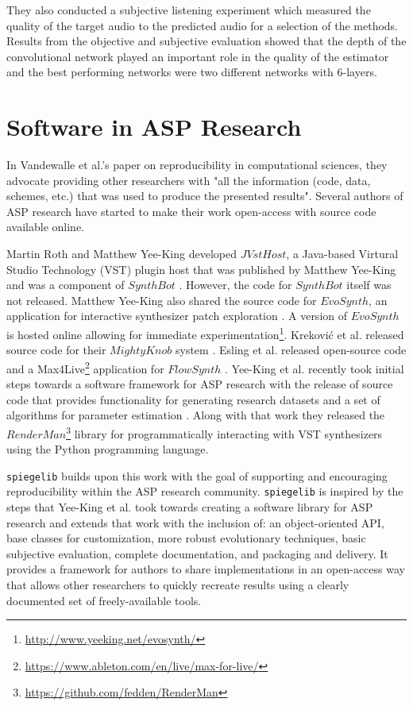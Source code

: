 They also conducted a subjective listening experiment which measured the quality of the target audio to the predicted audio for a selection of the methods. Results from the objective and subjective evaluation showed that the depth of the convolutional network played an important role in the quality of the estimator and the best performing networks were two different networks with 6-layers.

\section{Software in ASP Research}
 In Vandewalle et al.'s paper on reproducibility in computational sciences, they advocate providing other researchers with "all the information (code, data, schemes, etc.) that was used to produce the presented results"\cite{vandewalle2009reproducible}. Several authors of ASP research have started to make their work open-access with source code available online. 
 
 Martin Roth and Matthew Yee-King developed $JVstHost$, a Java-based Virtural Studio Technology (VST) plugin host that was published by Matthew Yee-King \cite{yee2011automatic} and was a component of $SynthBot$ \cite{yee2008synthbot}. However, the code for $SynthBot$ itself was not released. Matthew Yee-King also shared the source code for $EvoSynth$, an application for interactive synthesizer patch exploration \cite{yee2016use}. A version of $EvoSynth$ is hosted online allowing for immediate experimentation\footnote{\url{http://www.yeeking.net/evosynth/}}. Krekovi{\'c} et al. released source code for their $MightyKnob$ system \cite{krekovic2016algorithm}. Esling et al. released open-source code and a Max4Live\footnote{\url{https://www.ableton.com/en/live/max-for-live/}} application for $FlowSynth$ \cite{esling2020flow}. Yee-King et al. recently took initial steps towards a software framework for ASP research with the release of source code that provides functionality for generating research datasets and a set of algorithms for parameter estimation \cite{yee2018automatic}. Along with that work they released the $RenderMan$\footnote{\url{https://github.com/fedden/RenderMan}} library for programmatically interacting with VST synthesizers using the Python programming language.
 
 \texttt{spiegelib} builds upon this work with the goal of supporting and encouraging reproducibility within the ASP research community. \texttt{spiegelib} is inspired by the steps that Yee-King et al. took towards creating a software library for ASP research and extends that work with the inclusion of: an object-oriented API, base classes for customization, more robust evolutionary techniques, basic subjective evaluation, complete documentation, and packaging and delivery. It provides a framework for authors to share implementations in an open-access way that allows other researchers to quickly recreate results using a clearly documented set of freely-available tools.

